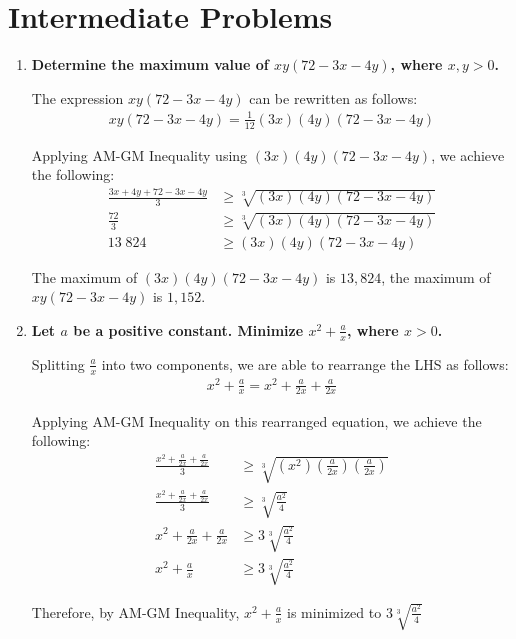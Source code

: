 \documentclass[12pt]{article}
\begin{document}
\section*{Intermediate Problems}
\begin{enumerate}
    \item \textbf{Determine the maximum value of $xy(72 - 3x - 4y)$, where $x, y > 0$.}
    
    The expression $xy(72 - 3x - 4y)$ can be rewritten as follows:
    \begin{align*}
        xy(72 - 3x - 4y) = \tfrac{1}{12}(3x)(4y)(72 - 3x - 4y)
    \end{align*}
    
    Applying AM-GM Inequality using $(3x)(4y)(72 - 3x - 4y)$, we achieve the following:
    \begin{align*}
        \frac{3x + 4y + 72 - 3x - 4y}{3} &\geq \sqrt[3]{(3x)(4y)(72 - 3x - 4y)} \\
        \frac{72}{3} &\geq \sqrt[3]{(3x)(4y)(72 - 3x - 4y)} \\
        13\;824 &\geq (3x)(4y)(72 - 3x - 4y)
    \end{align*}
    
    The maximum of $(3x)(4y)(72 - 3x - 4y)$ is $13,824$, the maximum of $xy(72 - 3x - 4y)$ is $1,152$.
    
    \item \textbf{Let $a$ be a positive constant. Minimize $x^2 + \frac{a}{x}$, where $x > 0$.} 
    
    Splitting $\frac{a}{x}$ into two components, we are able to rearrange the LHS as follows:
    \begin{align*}
        x^2 + \frac{a}{x} = x^2 + \frac{a}{2x} + \frac{a}{2x}
    \end{align*}
    
    Applying AM-GM Inequality on this rearranged equation, we achieve the following:
    \begin{align*}
        \frac{x^2 + \frac{a}{2x} + \frac{a}{2x}}{3} &\geq \sqrt[3]{(x^2)(\tfrac{a}{2x})(\tfrac{a}{2x})} \\
        \frac{x^2 + \frac{a}{2x} + \frac{a}{2x}}{3} &\geq \sqrt[3]{\tfrac{a^2}{4}} \\
        x^2 + \frac{a}{2x} + \frac{a}{2x} &\geq 3 \sqrt[3]{\frac{a^2}{4}} \\
        x^2 + \frac{a}{x} &\geq 3 \sqrt[3]{\frac{a^2}{4}}
    \end{align*}
    
    Therefore, by AM-GM Inequality, $x^2 + \frac{a}{x}$ is minimized to $3 \sqrt[3]{\frac{a^2}{4}}$
    
\end{enumerate}
\end{document}
